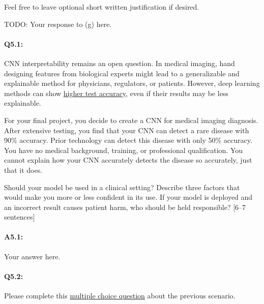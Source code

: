 \begin{enumerate}[(a)]

Feel free to leave optional short written justification if desired.

\begin{mdframed}
TODO: Your response to (g) here.
\end{mdframed}
\end{enumerate}




\pagebreak 
\paragraph{Q5.1:} CNN interpretability remains an open question. In medical imaging, hand designing features from biological experts might lead to a generalizable and explainable method for physicians, regulators, or patients. However, deep learning methods can show \href{https://drive.google.com/file/d/1bDAqEtW482OJeqMBt5A4AradVa4gf_o9/view}{higher test accuracy}, even if their results may be less explainable. 

For your final project, you decide to create a CNN for medical imaging diagnosis. After extensive testing, you find that your CNN can detect a rare disease with 90\% accuracy. Prior technology can detect this disease with only 50\% accuracy. You have no medical background, training, or professional qualification. You cannot explain how your CNN accurately detects the disease so accurately, just that it does. 

Should your model be used in a clinical setting? Describe three factors that would make you more or less confident in its use. If your model is deployed and an incorrect result causes patient harm, who should be held responsible? [6--7 sentences]

\paragraph{A5.1:} Your answer here.



\pagebreak
\paragraph{Q5.2:} Please complete this \href{https://docs.google.com/forms/d/e/1FAIpQLScJdjerPNCJu6kzMAhSgiUeturxoNUa3SdekSKJ-bc_Xutiiw/viewform?usp=sf_link}{multiple choice question} about the previous scenario. 

